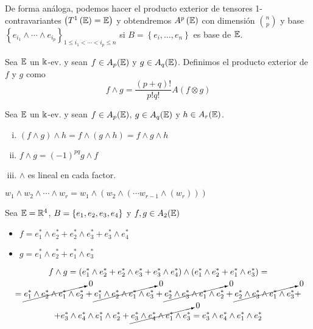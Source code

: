\begin{obs}
    De forma análoga, podemos hacer el producto exterior de tensores 1-contravariantes $\left( T^1 \left( \mathbb{E} \right) = \mathbb{E} \right)$
    y obtendremos $A^p\left( \mathbb{E} \right)$ con dimensión $\binom{n}{p}$ y base \break $\left\{ e_{i_1}
    \wedge \cdots \wedge e_{i_p} \right\}_{1 \leq i_1 < \cdots < i_p \leq n}$ si $B=\left\{e_i, \dots , e_n\right\}$ es base de $\mathbb{E}$.
\end{obs}

\begin{defi}
    Sea $\mathbb{E}$ un $\Bbbk$-ev. y sean $f \in A_p(\mathbb{E})$ y $g \in A_q(\mathbb{E})$. Definimos el
    producto exterior de $f$ y $g$ como
    \[
        f \wedge g = \frac{(p+q)!}{p!q!}A(f \otimes g)
    \]
\end{defi}
\begin{prop}
    Sea $\mathbb{E}$ un $\Bbbk$-ev. y sean $f \in A_p(\mathbb{E})$, $g \in A_q(\mathbb{E})$ y $h \in A_r(\mathbb{E})$.
    \begin{enumerate}[i)]
        \item $(f \wedge g) \wedge h = f \wedge (g \wedge h) = f \wedge g \wedge h$
        \item $f \wedge g = (-1)^{pq} g \wedge f$
        \item $\wedge$ es lineal en cada factor.
    \end{enumerate}
\end{prop}
\begin{obs}
    $w_1 \wedge w_2 \wedge \cdots \wedge w_r = w_1 \wedge (w_2 \wedge (
    \cdots w_{r-1} \wedge (w_r)))$
\end{obs}
\begin{example}
    Sea $\mathbb{E} = \mathbb{R} ^4$, $B = \left\{e_1,e_2,e_3,e_4\right\}$ y $f,g \in A_2(\mathbb{E})$
    \begin{itemize}
        \item $f = e_1^* \wedge e_2^* + e_2^* \wedge e_3^* + e_3^* \wedge e_4^*$
        \item $g = e_1^* \wedge e_2^* + e_1^* \wedge e_3^*$
    \end{itemize}
    \begin{gather*}
        f \wedge g = (e_1^* \wedge e_2^* + e_2^* \wedge e_3^* + e_3^* \wedge e_4^*)
        \wedge (e_1^* \wedge e_2^* + e_1^* \wedge e_3^*) = \\
         = \cancelto{0}{e_1^* \wedge e_2^* \wedge e_1^* \wedge e_2^*} +
         \cancelto{0}{e_1^* \wedge e_2^* \wedge e_1^* \wedge e_3^*} +
         \cancelto{0}{e_2^* \wedge e_3^* \wedge e_1^* \wedge e_2^*} +
         \cancelto{0}{e_2^* \wedge e_3^* \wedge e_1^* \wedge e_3^*} + \\
         + e_3^* \wedge e_4^* \wedge e_1^* \wedge e_2^* +
         \cancelto{0}{e_3^* \wedge e_4^* \wedge e_1^* \wedge e_3^*} =
         e_3^* \wedge e_4^* \wedge e_1^* \wedge e_2^*
    \end{gather*}
\end{example}
